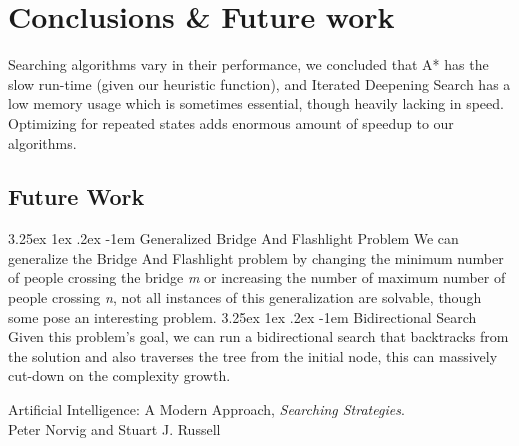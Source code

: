 \documentclass[12pt]{diazessay}
\makeatletter
\renewcommand\paragraph{\@startsection{paragraph}{5}{\z@}%
  {3.25ex \@plus1ex \@minus.2ex}%
  {-1em}%
  {\normalfont\normalsize\bfseries}}
\makeatother
\begin{document}
\clearpage
\section{Conclusions \& Future work}
    Searching algorithms vary in their performance, we concluded that A* has the slow run-time (given our heuristic function), and Iterated Deepening Search has a low memory usage which is sometimes essential, though heavily lacking in speed. Optimizing for repeated states adds enormous amount of speedup to our algorithms.
    \subsection{Future Work}
        \paragraph{Generalized Bridge And Flashlight Problem} We can generalize the Bridge And Flashlight problem by changing the minimum number of people crossing the bridge \textit{m} or increasing the number of maximum number of people crossing \textit{n}, not all instances of this generalization are solvable, though some pose an interesting problem.
        \paragraph{Bidirectional Search} Given this problem's goal, we can run a bidirectional search that backtracks from the solution and also traverses the tree from the initial node, this can massively cut-down on the complexity growth.


\begin{thebibliography}{9}

Artificial Intelligence: A Modern Approach,
\textit{Searching Strategies}. \\
Peter Norvig and Stuart J. Russell


\end{thebibliography}
\end{document}
